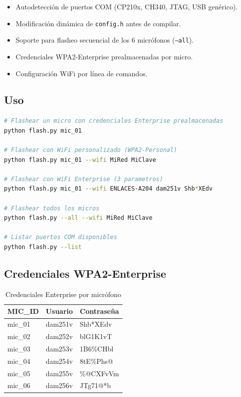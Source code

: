 \documentclass[12pt,a4paper]{report}
\begin{document}
\begin{itemize}
    \item Autodetecci\'on de puertos COM (CP210x, CH340, JTAG, USB gen\'erico).
    \item Modificaci\'on din\'amica de \texttt{config.h} antes de compilar.
    \item Soporte para flasheo secuencial de los 6 micr\'ofonos (\texttt{--all}).
    \item Credenciales WPA2-Enterprise prealmacenadas por micro.
    \item Configuraci\'on WiFi por l\'inea de comandos.
\end{itemize}

\subsection{Uso}

\begin{lstlisting}[language=bash, caption={Ejemplos de uso de flash.py}]
# Flashear un micro con credenciales Enterprise prealmacenadas
python flash.py mic_01

# Flashear con WiFi personalizado (WPA2-Personal)
python flash.py mic_01 --wifi MiRed MiClave

# Flashear con WiFi Enterprise (3 parametros)
python flash.py mic_01 --wifi ENLACES-A204 dam251v Shb*XEdv

# Flashear todos los micros
python flash.py --all --wifi MiRed MiClave

# Listar puertos COM disponibles
python flash.py --list
\end{lstlisting}

\subsection{Credenciales WPA2-Enterprise}

\begin{table}[H]
\centering
\begin{tabular}{lll}
\toprule
\textbf{MIC\_ID} & \textbf{Usuario} & \textbf{Contrase\~na} \\
\midrule
mic\_01 & dam251v & Shb*XEdv \\
mic\_02 & dam252v & blG1K1vT \\
mic\_03 & dam253v & 1B6\%CHbl \\
mic\_04 & dam254v & 8tE\%Phs@ \\
mic\_05 & dam255v & \%@CXFvVm \\
mic\_06 & dam256v & JTg71@*b \\
\bottomrule
\end{tabular}
\caption{Credenciales Enterprise por micr\'ofono}
\end{table}
\end{document}
